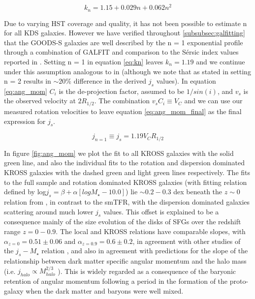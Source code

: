\documentclass[fleqn,usenatbib]{mn2e}
\newcommand{\Sers}{S\'{e}rsic }
\begin{document}
\begin{equation}\label{eq:kn}
   k_{n} = 1.15 + 0.029n + 0.062n^{2}
\end{equation}

Due to varying HST coverage and quality, it has not been possible to estimate n for all KDS galaxies.
However we have verified throughout \cref{subsubsec:galfitting} that the GOODS-S galaxies are well described by the n = 1 exponential profile through a combination of GALFIT and comparison to the \Sers index values reported in \cite{VanderWel2012}.
Setting n = 1 in equation \ref{eq:kn} leaves $k_{n} = 1.19$ and we continue under this assumption analogous to in \cite{Harrison2017} (although we note that as stated in \cite{Harrison2017} setting n = 2 results in $\sim20\%$ difference in the derived $j_{s}$ values).
In equation \ref{eq:ang_mom} $C_{i}$ is the de-projection factor, assumed to be $1/sin(i)$, and $v_{s}$ is the observed velocity at $2R_{1/2}$.
The combination $v_{s}C_{i} \equiv V_{C}$ and we can use our measured rotation velocities to leave equation \ref{eq:ang_mom_final} as the final expression for $j_{s}$. 

\begin{equation}\label{eq:ang_mom_final}
   j_{n=1} \equiv j_{s} = 1.19V_{C}R_{1/2}
\end{equation}

In figure \ref{fig:ang_mom} we plot the fit to all KROSS galaxies with the solid green line, and also the individual fits to the rotation and dispersion dominated KROSS galaxies with the dashed green and light green lines respectively.
The fits to the full sample and rotation dominated KROSS galaxies (with fitting relation defined by log$j_{s} =  \beta + \alpha[logM_{\star} - 10.0]$) lie $\sim0.2-0.3$ dex beneath the $z\sim0$ relation from \cite{Romanowsky2012}, in contrast to the smTFR, with the dispersion dominated galaxies scattering around much lower $j_{s}$ values.
This offset is explained to be a consequence mainly of the size evolution of the disks of SFGs over the redshift range $z=0-0.9$.
The local and KROSS relations have comparable slopes, with $\alpha_{z=0}=0.51\pm0.06$ and $\alpha_{z=0.9}=0.6\pm0.2$, in agreement with other studies of the $j_{s}-M_{\star}$ relation \citep{Cortese2016,Contini2015a,Burkert2016a,Swinbank2017}, and also in agreement with predictions for the slope of the relationship between dark matter specific angular momentum and the halo mass (i.e. $j_{halo} \propto M_{halo}^{2/3}$ \citep[e.g.][]{Barnes1987}).
This is widely regarded as a consequence of the baryonic retention of angular momentum following a period in the formation of the proto-galaxy when the dark matter and baryons were well mixed. \\
\end{document}
